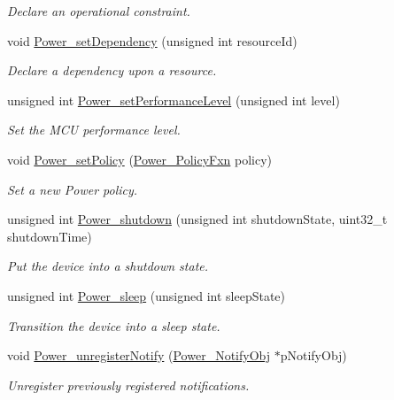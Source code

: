 \begin{DoxyCompactItemize}
\begin{DoxyCompactList}\small\item\em Declare an operational constraint. \end{DoxyCompactList}\item 
void \hyperlink{_power_8h_a2f2f4dfed7da8eed50a5b82e2bad26b5}{Power\+\_\+set\+Dependency} (unsigned int resource\+Id)
\begin{DoxyCompactList}\small\item\em Declare a dependency upon a resource. \end{DoxyCompactList}\item 
unsigned int \hyperlink{_power_8h_ade9f8442c59deb341f6f5da729e90635}{Power\+\_\+set\+Performance\+Level} (unsigned int level)
\begin{DoxyCompactList}\small\item\em Set the M\+C\+U performance level. \end{DoxyCompactList}\item 
void \hyperlink{_power_8h_aa4af0d238813058bf6146df6021df8cc}{Power\+\_\+set\+Policy} (\hyperlink{_power_8h_a333038d1e9cd5f93dda7b83f8a1afa8b}{Power\+\_\+\+Policy\+Fxn} policy)
\begin{DoxyCompactList}\small\item\em Set a new Power policy. \end{DoxyCompactList}\item 
unsigned int \hyperlink{_power_8h_a29fb5d887d2b49ffbe86472dee8cd338}{Power\+\_\+shutdown} (unsigned int shutdown\+State, uint32\+\_\+t shutdown\+Time)
\begin{DoxyCompactList}\small\item\em Put the device into a shutdown state. \end{DoxyCompactList}\item 
unsigned int \hyperlink{_power_8h_ad26ff0368295bc388f8cbcaa289fb4b2}{Power\+\_\+sleep} (unsigned int sleep\+State)
\begin{DoxyCompactList}\small\item\em Transition the device into a sleep state. \end{DoxyCompactList}\item 
void \hyperlink{_power_8h_ac32c17ce6da099da97957f08ddb000b4}{Power\+\_\+unregister\+Notify} (\hyperlink{struct_power___notify_obj}{Power\+\_\+\+Notify\+Obj} $\ast$p\+Notify\+Obj)
\begin{DoxyCompactList}\small\item\em Unregister previously registered notifications. \end{DoxyCompactList}\end{DoxyCompactItemize}


